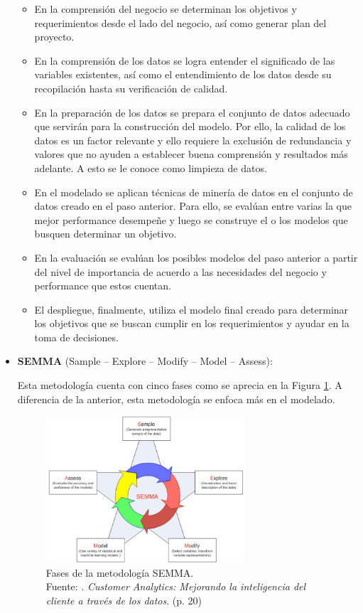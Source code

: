 \begin{itemize}
	\begin{itemize}
		\item En la comprensión del negocio se determinan los objetivos y requerimientos desde el lado del negocio, así como generar plan del proyecto.
		\item En la comprensión de los datos se logra entender el significado de las variables existentes, así como el entendimiento de los datos desde su recopilación hasta su verificación de calidad.
		\item En la preparación de los datos se prepara el conjunto de datos adecuado que servirán para la construcción del modelo. Por ello, la calidad de los datos es un factor relevante y ello requiere la exclusión de redundancia y valores que no ayuden a establecer buena comprensión y resultados más adelante. A esto se le conoce como limpieza de datos.
		\item En el modelado se aplican técnicas de minería de datos en el conjunto de datos creado en el paso anterior. Para ello, se evalúan entre varias la que mejor performance desempeñe y luego se construye el o los modelos que busquen determinar un objetivo.
		\item En la evaluación se evalúan los posibles modelos del paso anterior a partir del nivel de importancia de acuerdo a las necesidades del negocio y performance que estos cuentan.
		\item El despliegue, finalmente, utiliza el modelo final creado para determinar los objetivos que se buscan cumplir en los requerimientos y ayudar en la toma de decisiones.
	\end{itemize}
	
	\item \textbf{SEMMA} (Sample – Explore – Modify – Model – Assess):
	
	Esta metodología cuenta con cinco fases como se aprecia en la Figura \ref{2:fig10}. A diferencia de la anterior, esta metodología se enfoca más en el modelado.
	\begin{figure}[h]
		\begin{center}
			\includegraphics[width=0.70\textwidth]{2/figures/semma.jpg}
			\caption[Fases de la metodología SEMMA]{Fases de la metodología SEMMA.\\
			Fuente: \cite{tec_braulio2015metodologiasdm}. \textit{Customer Analytics: Mejorando la inteligencia del cliente a través de los datos}. (p. 20)}
			\label{2:fig10}
		\end{center}
	\end{figure}
	

\end{itemize}
